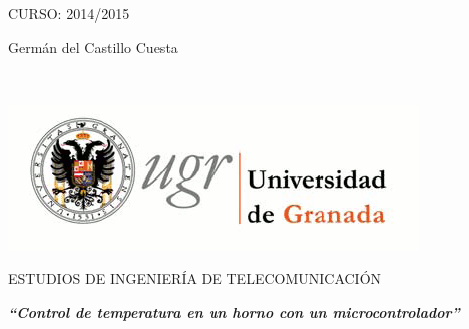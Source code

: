 \begin{center}
\vspace*{3cm} 
\par\end{center}

\begin{center}
{\large CURSO: 2014/2015}
\par\end{center}{\large \par}

\begin{center}
{\large Germán del Castillo Cuesta}
\par\end{center}{\large \par}

\newpage
\thispagestyle{empty}

~

\newpage
\thispagestyle{empty}

\begin{center}
\includegraphics[scale=0.8]{logo_ugr.png}
\par\end{center}

\begin{center}
ESTUDIOS DE INGENIERÍA DE TELECOMUNICACIÓN
\par\end{center}

\begin{center}
\vspace*{0.1cm}
\par\end{center}

\begin{center}
\textbf{\emph{\Large {}``Control de temperatura en un horno con un microcontrolador''}}
\par\end{center}{\Large \par}

\begin{center}
\vspace*{0.3cm}
\par\end{center}

